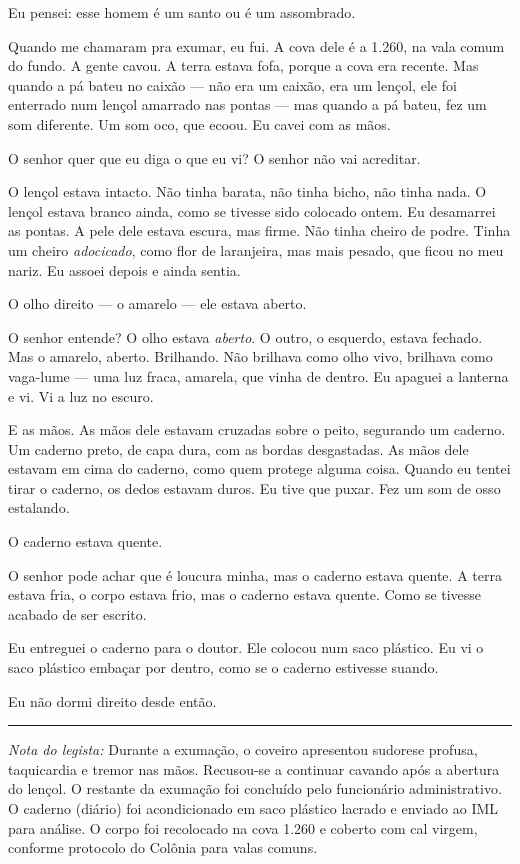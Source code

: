 Eu pensei: esse homem é um santo ou é um assombrado.

Quando me chamaram pra exumar, eu fui. A cova dele é a 1.260, na vala comum do fundo. A gente cavou. A terra estava fofa, porque a cova era recente. Mas quando a pá bateu no caixão --- não era um caixão, era um lençol, ele foi enterrado num lençol amarrado nas pontas --- mas quando a pá bateu, fez um som diferente. Um som oco, que ecoou. Eu cavei com as mãos.

O senhor quer que eu diga o que eu vi? O senhor não vai acreditar.

O lençol estava intacto. Não tinha barata, não tinha bicho, não tinha nada. O lençol estava branco ainda, como se tivesse sido colocado ontem. Eu desamarrei as pontas. A pele dele estava escura, mas firme. Não tinha cheiro de podre. Tinha um cheiro \textit{adocicado}, como flor de laranjeira, mas mais pesado, que ficou no meu nariz. Eu assoei depois e ainda sentia.

O olho direito --- o amarelo --- ele estava aberto.

O senhor entende? O olho estava \textit{aberto}. O outro, o esquerdo, estava fechado. Mas o amarelo, aberto. Brilhando. Não brilhava como olho vivo, brilhava como vaga-lume --- uma luz fraca, amarela, que vinha de dentro. Eu apaguei a lanterna e vi. Vi a luz no escuro.

E as mãos. As mãos dele estavam cruzadas sobre o peito, segurando um caderno. Um caderno preto, de capa dura, com as bordas desgastadas. As mãos dele estavam em cima do caderno, como quem protege alguma coisa. Quando eu tentei tirar o caderno, os dedos estavam duros. Eu tive que puxar. Fez um som de osso estalando.

O caderno estava quente.

O senhor pode achar que é loucura minha, mas o caderno estava quente. A terra estava fria, o corpo estava frio, mas o caderno estava quente. Como se tivesse acabado de ser escrito.

Eu entreguei o caderno para o doutor. Ele colocou num saco plástico. Eu vi o saco plástico embaçar por dentro, como se o caderno estivesse suando.

Eu não dormi direito desde então.

\vspace{1em}
\hrule
\vspace{1em}

\noindent\textit{Nota do legista:} Durante a exumação, o coveiro apresentou sudorese profusa, taquicardia e tremor nas mãos. Recusou-se a continuar cavando após a abertura do lençol. O restante da exumação foi concluído pelo funcionário administrativo. O caderno (diário) foi acondicionado em saco plástico lacrado e enviado ao IML para análise. O corpo foi recolocado na cova 1.260 e coberto com cal virgem, conforme protocolo do Colônia para valas comuns.


